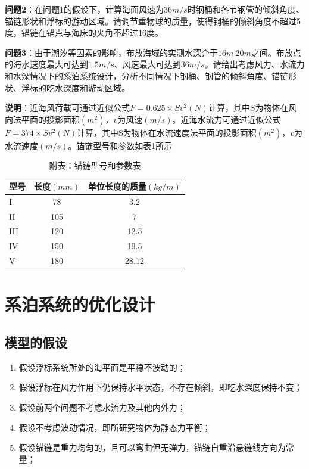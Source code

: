 \documentclass[UTF8]{ctexbook}
\theoremstyle{nonumberplain}
\begin{document}
    \par
    \textbf{问题2}：在问题1的假设下，计算海面风速为$36m/s$时钢桶和各节钢管的倾斜角度、锚链形状和浮标的游动区域。请调节重物球的质量，使得钢桶的倾斜角度不超过5度，锚链在锚点与海床的夹角不超过16度。
    \par
    \textbf{问题3}：由于潮汐等因素的影响，布放海域的实测水深介于$16m~20m$之间。布放点的海水速度最大可达到$1.5m/s$、风速最大可达到$36m/s$。请给出考虑风力、水流力和水深情况下的系泊系统设计，分析不同情况下钢桶、钢管的倾斜角度、锚链形状、浮标的吃水深度和游动区域。
    \par
    \textbf{说明}：近海风荷载可通过近似公式$F=0.625\times Sv^2(N)$计算，其中$S$为物体在风向法平面的投影面积$(m^2)$，$v$为风速$(m/s)$。近海水流力可通过近似公式$F=374\times Sv^2(N)$计算，其中S为物体在水流速度法平面的投影面积$(m^2)$，$v$为水流速度$(m/s)$。锚链型号和参数如表\ref{tab:锚链型号和参数表}所示
    \begin{table}[htbp]
    \caption{附表：锚链型号和参数表}
    \label{tab:锚链型号和参数表}
    \centering
    \begin{tabular}{l|cc}
    \toprule
    型号&  长度$(mm)$&  单位长度的质量$(kg/m)$\\
    \midrule
    I   & 78  & 3.2\\
    II  & 105 & 7\\
    III & 120 & 12.5\\
    IV  & 150 & 19.5\\
    V   & 180 & 28.12\\
    \bottomrule
    \end{tabular}
    \end{table}

\section{系泊系统的优化设计}
    \subsection{模型的假设}
        \begin{enumerate}
        \item 假设浮标系统所处的海平面是平稳不波动的；
        \item 假设浮标在风力作用下仍保持水平状态，不存在倾斜，即吃水深度保持不变；
        \item 假设前两个问题不考虑水流力及其他内外力；
        \item 假设不考虑波动情况，即所研究物体为静态力平衡；
        \item 假设锚链是重力均匀的，且可以弯曲但无弹力，锚链自重沿悬链线方向为常量；
        \end{enumerate}
\end{document}

